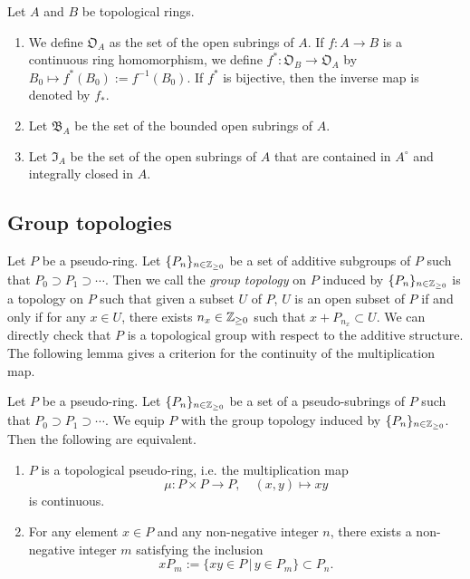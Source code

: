 \begin{dfn}\label{d-OBI}
Let $A$ and $B$ be topological rings. 
\begin{enumerate}
\item 
We define $\mathfrak O_A$ as 
the set of the open subrings of $A$. 
If $f:A \to B$ is a continuous ring homomorphism, 
we define $f^*:\mathfrak O_{B} \to \mathfrak O_{A}$ 
by $B_0 \mapsto f^*(B_0):=f^{-1}(B_0)$. 
If $f^*$ is bijective, then the inverse map is denoted by $f_*$. 
\item 
Let $\mathfrak B_{A}$ be the set of the bounded open subrings 
of $A$. 
\item 
Let $\mathfrak I_{A}$ be the set of 
the open subrings of $A$ 
that are contained in $A^{\circ}$ and integrally closed in $A$. 
\end{enumerate}
\end{dfn}



\subsection{Group topologies}

Let $P$ be a pseudo-ring. 
Let $\{P_n\}_{n \in \mathbb{Z}_{\geq 0}}$ be a set of additive subgroups of $P$ 
such that $P_{0} \supset P_{1} \supset \cdots$. 
Then we call the {\em group topology} on $P$ 
induced by $\{P_n\}_{n \in \mathbb{Z}_{\geq 0}}$ is a topology on $P$ 
such that given a subset $U$ of $P$, 
$U$ is an open subset of $P$ if and only if 
for any $x \in U$, there exists $n_x \in \mathbb{Z}_{\geq 0}$ such that 
$x+P_{n_x} \subset U$. 
We can directly check that $P$ is a topological group 
with respect to the additive structure. 
The following lemma gives a criterion 
for the continuity of the multiplication map. 

\begin{lem}\label{l-top-criterion}
Let $P$ be a pseudo-ring. 
Let $\{P_n\}_{n \in \mathbb{Z}_{\geq 0}}$ be a set of a pseudo-subrings of $P$ 
such that $P_0 \supset P_1 \supset \cdots$. 
We equip $P$ with the group topology induced by $\{P_n\}_{n \in \mathbb{Z}_{\geq 0}}$. 
Then the following are equivalent. 
\begin{enumerate}
\item 
$P$ is a topological pseudo-ring, i.e. the multiplication map 
$$\mu:P \times P \to P,\quad (x, y) \mapsto xy$$
is continuous. 
\item 
For any element $x \in P$ and any non-negative integer $n$, 
there exists a non-negative integer $m$ satisfying the inclusion  
$$
xP_m:=\{xy \in P\,|\, y \in P_m\} \subset P_n.
$$
\end{enumerate}
\end{lem}


